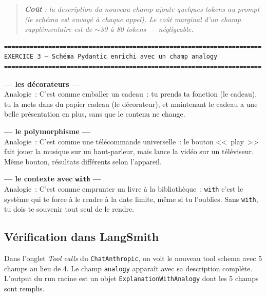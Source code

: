 \documentclass[11pt,a4paper]{article}
\begin{document}
\begin{quote}\itshape
\textbf{Coût} : la description du nouveau champ ajoute quelques tokens
au prompt (le schéma est envoyé à chaque appel). Le coût marginal d'un
champ supplémentaire est de $\sim$30 à 80 tokens — négligeable.
\end{quote}

\begin{tcolorbox}[
  colback=white,
  colframe=black!50,
  coltitle=black,
  fonttitle=\footnotesize\bfseries,
  fontupper=\footnotesize,
  title=Sortie de l'exécution,
  breakable,
]
\begin{verbatim}
======================================================================
EXERCICE 3 — Schéma Pydantic enrichi avec un champ analogy
======================================================================
\end{verbatim}

\textbf{--- les décorateurs ---}\\
Analogie~: C'est comme emballer un cadeau~: tu prends ta fonction (le
cadeau), tu la mets dans du papier cadeau (le décorateur), et maintenant
le cadeau a une belle présentation en plus, sans que le contenu ne
change.

\textbf{--- le polymorphisme ---}\\
Analogie~: C'est comme une télécommande universelle~: le bouton
<<~play~>> fait jouer la musique sur un haut-parleur, mais lance la
vidéo sur un téléviseur. Même bouton, résultats différents selon
l'appareil.

\textbf{--- le contexte avec \texttt{with} ---}\\
Analogie~: C'est comme emprunter un livre à la bibliothèque~:
\texttt{with} c'est le système qui te force à le rendre à la date
limite, même si tu l'oublies. Sans \texttt{with}, tu dois te souvenir
tout seul de le rendre.
\end{tcolorbox}

\subsection{Vérification dans LangSmith}

Dans l'onglet \emph{Tool calls} du \texttt{ChatAnthropic}, on voit le
nouveau tool schema avec 5 champs au lieu de 4. Le champ \texttt{analogy}
apparaît avec sa description complète. L'output du run racine est un
objet \texttt{ExplanationWithAnalogy} dont les 5 champs sont remplis.

\begin{center}
\end{center}
\end{document}
